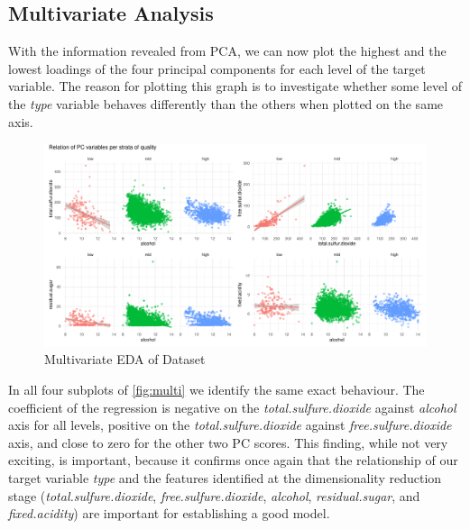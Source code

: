 \documentclass[11pt,twoside]{article}
\numberwithin{Theorem}{section}
\numberwithin{Definition}{section}
\numberwithin{Lemma}{section}
\numberwithin{Algorithm}{section}
\numberwithin{equation}{section}
\begin{document}
\subsection{Multivariate Analysis}
\label{sec:multivariate}
With the information revealed from PCA, we can now plot the highest and the lowest loadings of the four principal components for each level of the target variable. The reason for plotting this graph is to investigate whether some level of the \textit{type} variable behaves differently than the others when plotted on the same axis.
\vspace*{1em}
\begin{figure}[!h]
\centering
\includegraphics[width=\textwidth]{./output/1.g.multivariate-analysis.pdf}
\caption{Multivariate EDA of Dataset}
\label{fig:multi}
\end{figure}
\vspace{2em}
In all four subplots of \autoref{fig:multi} we identify the same exact behaviour. The coefficient of the regression is negative on the \textit{total.sulfure.dioxide} against \textit{alcohol} axis for all levels, positive on the \textit{total.sulfure.dioxide} against \textit{free.sulfure.dioxide} axis, and close to zero for the other two PC scores. This finding, while not very exciting, is important, because it confirms once again that the relationship of our target variable \textit{type} and the features identified at the dimensionality reduction stage (\textit{total.sulfure.dioxide}, \textit{free.sulfure.dioxide}, \textit{alcohol}, \textit{residual.sugar}, and \textit{fixed.acidity}) are important for establishing a good model.
\end{document}
